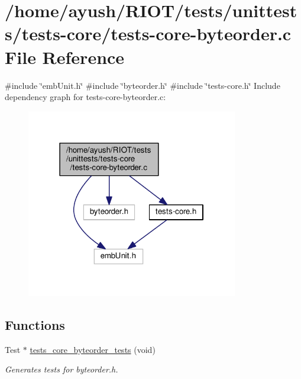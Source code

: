 \hypertarget{tests-core-byteorder_8c}{}\section{/home/ayush/\+R\+I\+O\+T/tests/unittests/tests-\/core/tests-\/core-\/byteorder.c File Reference}
\label{tests-core-byteorder_8c}
{\ttfamily \#include \char`\"{}emb\+Unit.\+h\char`\"{}}\newline
{\ttfamily \#include \char`\"{}byteorder.\+h\char`\"{}}\newline
{\ttfamily \#include \char`\"{}tests-\/core.\+h\char`\"{}}\newline
Include dependency graph for tests-\/core-\/byteorder.c\+:
\nopagebreak
\begin{figure}[H]
\begin{center}
\leavevmode
\includegraphics[width=262pt]{tests-core-byteorder_8c__incl}
\end{center}
\end{figure}
\subsection*{Functions}
\begin{DoxyCompactItemize}
\item 
Test $\ast$ \hyperlink{group__unittests_ga664f87f90c88e1bb9d124238e01076d1}{tests\+\_\+core\+\_\+byteorder\+\_\+tests} (void)
\begin{DoxyCompactList}\small\item\em Generates tests for byteorder.\+h. \end{DoxyCompactList}\end{DoxyCompactItemize}
